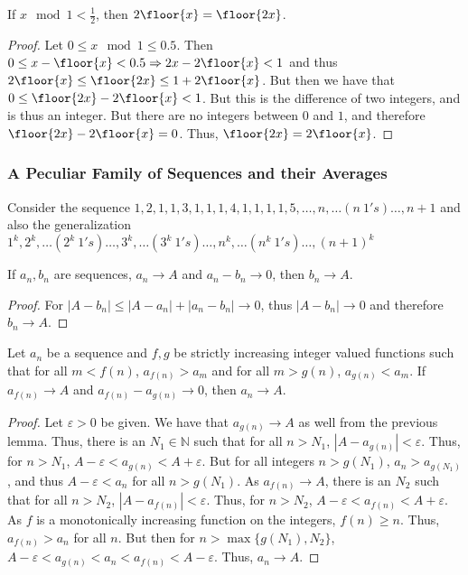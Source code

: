         \begin{theorem}
        If $x\mod 1 < \frac{1}{2}$, then $2\floor{x} = \floor{2x}$.
        \end{theorem}
        \begin{proof}
        Let $0\leq x \mod 1 \leq 0.5$. Then $0 \leq x-\floor{x}<0.5 \Rightarrow 2x-2\floor{x} <1$ and thus $2\floor{x} \leq \floor{2x} \leq 1+2\floor{x}$. But then we have that $0 \leq \floor{2x}-2\floor{x} <1$. But this is the difference of two integers, and is thus an integer. But there are no integers between $0$ and $1$, and therefore $\floor{2x}-2\floor{x} = 0$. Thus, $\floor{2x}=2\floor{x}$.
        \end{proof}
        \subsubsection{A Peculiar Family of Sequences and their Averages}
        Consider the sequence $1,2,1,1,3,1,1,1,4,1,1,1,1,5,\hdots, n,\hdots (n\ 1's)\hdots, n+1$ and also the generalization $1^k, 2^k,\hdots (2^k\ 1's)\hdots, 3^k, \hdots (3^k\ 1's)\hdots, n^k, \hdots (n^k\ 1's)\hdots, (n+1)^k$
        \begin{theorem}
        If $a_n, b_n$ are sequences, $a_n\rightarrow A$ and $a_n-b_n\rightarrow 0$, then $b_n \rightarrow A$.
        \end{theorem}
        \begin{proof}
        For $|A-b_n| \leq |A-a_n|+|a_n-b_n| \rightarrow 0$, thus $|A-b_n|\rightarrow 0$ and therefore $b_n \rightarrow A$.
        \end{proof}
        \begin{theorem}
        Let $a_n$ be a sequence and $f,g$ be strictly increasing integer valued functions such that for all $m<f(n)$, $a_{f(n)}>a_m$ and for all $m>g(n)$, $a_{g(n)}<a_m$. If $a_{f(n)}\rightarrow A$ and $a_{f(n)}-a_{g(n)}\rightarrow 0$, then $a_n \rightarrow A$.
        \end{theorem}
        \begin{proof}
        Let $\varepsilon>0$ be given. We have that $a_{g(n)}\rightarrow A$ as well from the previous lemma. Thus, there is an $N_1 \in \mathbb{N}$ such that for all $n>N_1$, $|A-a_{g(n)}|<\varepsilon$. Thus, for $n>N_1$, $A-\varepsilon < a_{g(n)}<A+\varepsilon$. But for all integers $n>g(N_1)$, $a_n >a_{g(N_1)}$, and thus $A-\varepsilon < a_n$ for all $n>g(N_1)$. As $a_{f(n)}\rightarrow A$, there is an $N_2$ such that for all $n>N_2$, $|A-a_{f(n)}|<\varepsilon$. Thus, for $n>N_2$, $A-\varepsilon < a_{f(n)}<A+\varepsilon$. As $f$ is a monotonically increasing function on the integers, $f(n)\geq n$. Thus, $a_{f(n)}>a_n$ for all $n$. But then for $n>\max\{g(N_1),N_2\}$, $A-\varepsilon < a_{g(n)} < a_n < a_{f(n)}<A-\varepsilon$. Thus, $a_n \rightarrow A$.
        \end{proof}

